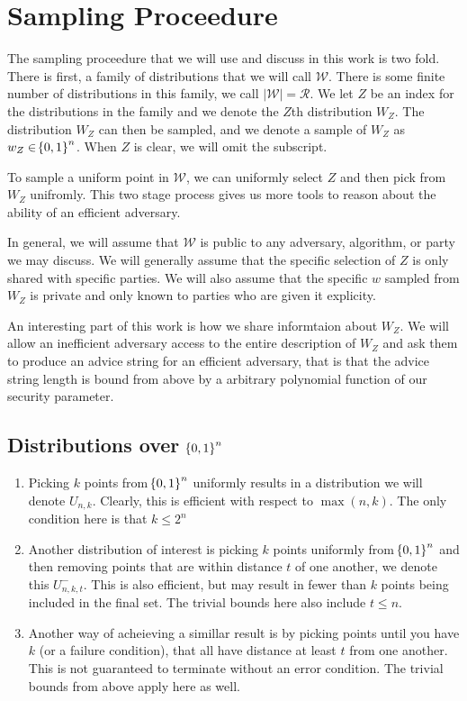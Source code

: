 
\section{Sampling Proceedure}
The sampling proceedure that we will use and discuss in this work is two fold.
There is first, a family of distributions that we will call $\mathcal{W}$. 
There is some finite number of distributions in this family, we call $|\mathcal{W}| = \mathcal{R}$. 
We let $Z$ be an index for the distributions in the family and we denote the $Z$th distribution $W_Z$. 
The distribution $W_Z$ can then be sampled, and we denote a sample of $W_Z$ as $w_{Z} \in \!\left\{ 0,1 \right\}^{n}$. When $Z$ is clear, we will omit the subscript.

To sample a uniform point in $\mathcal{W}$, we can uniformly select $Z$ and then pick from $W_Z$ unifromly. 
This two stage process gives us more tools to reason about the ability of an efficient adversary. 

In general, we will assume that $\mathcal{W}$ is public to any adversary, algorithm, or party we may discuss. 
We will generally assume that the specific selection of $Z$ is only shared with specific parties.
We will also assume that the specific $w$ sampled from $W_Z$ is private and only known to parties who are given it explicity. 

An interesting part of this work is how we share informtaion about $W_Z$. We will allow an inefficient adversary access to the entire description of $W_Z$ and ask them to produce an advice string for an efficient adversary, that is that the advice string length is bound from above by a arbitrary polynomial function of our security parameter. 

\subsection{Distributions over $\!\left\{ 0,1 \right\}^{n}$}
\begin{enumerate}
    \item Picking $k$ points from $\!\left\{ 0,1 \right\}^{n}$ uniformly results in a distribution we will denote $U_{n,k}$. 
    Clearly, this is efficient with respect to $\max{(n,k)}$.
    The only condition here is that $k \leq 2^n$

    \item Another distribution of interest is picking $k$ points uniformly from $\!\left\{ 0,1 \right\}^{n}$ and then removing points that are within distance $t$ of one another, we denote this $U_{n,k,t}^{-}$. 
    This is also efficient, but may result in fewer than $k$ points being included in the final set. 
    The trivial bounds here also include $t \leq n$. 

    \item Another way of acheieving a simillar result is by picking points until you have $k$ (or a failure condition), that all have distance at least $t$ from one another.
    This is not guaranteed to terminate without an error condition. 
    The trivial bounds from above apply here as well. 
\end{enumerate}
 